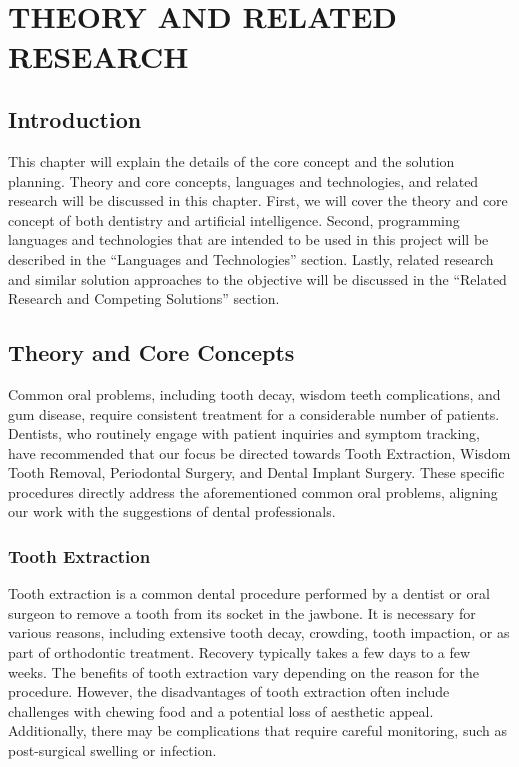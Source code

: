 \documentclass[12pt,oneside,openright,a4paper]{cpe-english-project}
\begin{document}
\chapter{\null\\ THEORY AND RELATED RESEARCH}
\section{Introduction}
  \qquad This chapter will explain the details of the core concept and the solution planning. Theory and core concepts, languages and technologies, and related research will be discussed in this chapter. First, we will cover the theory and core concept of both dentistry and artificial intelligence. Second, programming languages and technologies that are intended to be used in this project will be described in the “Languages and Technologies” section. Lastly, related research and similar solution approaches to the objective will be discussed in the “Related Research and Competing Solutions” section.

\section{Theory and Core Concepts}
  \qquad Common oral problems, including tooth decay, wisdom teeth complications, and gum disease, require consistent treatment for a considerable number of patients. Dentists, who routinely engage with patient inquiries and symptom tracking, have recommended that our focus be directed towards Tooth Extraction, Wisdom Tooth Removal, Periodontal Surgery, and Dental Implant Surgery. These specific procedures directly address the aforementioned common oral problems, aligning our work with the suggestions of dental professionals.\par
  \subsection{Tooth Extraction}
    \qquad Tooth extraction is a common dental procedure performed by a dentist or oral surgeon to remove a tooth from its socket in the jawbone. It is necessary for various reasons, including extensive tooth decay, crowding, tooth impaction, or as part of orthodontic treatment. Recovery typically takes a few days to a few weeks. The benefits of tooth extraction vary depending on the reason for the procedure. However, the disadvantages of tooth extraction often include challenges with chewing food and a potential loss of aesthetic appeal. Additionally, there may be complications that require careful monitoring, such as post-surgical swelling or infection.\par
\end{document}
